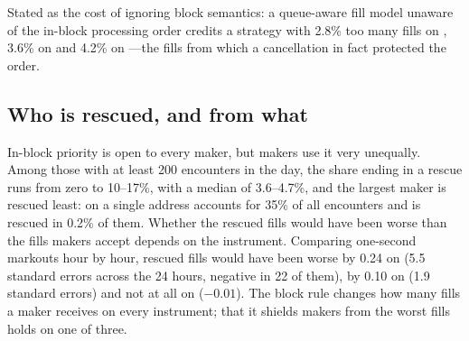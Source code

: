 Stated as the cost of ignoring block semantics: a queue-aware fill model unaware
of the in-block processing order credits a strategy with 2.8\% too many fills on
\BTC, 3.6\% on \ETH{} and 4.2\% on \SOL---the fills from which a cancellation in
fact protected the order.

\subsection{Who is rescued, and from what}
In-block priority is open to every maker, but makers use it very unequally. Among
those with at least 200 encounters in the day, the share ending in a rescue runs
from zero to 10--17\%, with a median of 3.6--4.7\%, and the largest maker is
rescued least: on \BTC{} a single address accounts for 35\% of all encounters and
is rescued in 0.2\% of them. Whether the rescued fills would have been worse than
the fills makers accept depends on the instrument. Comparing one-second markouts
hour by hour, rescued fills would have been worse by 0.24\bps{} on \SOL{} (5.5
standard errors across the 24 hours, negative in 22 of them), by 0.10\bps{} on
\ETH{} (1.9 standard errors) and not at all on \BTC{} ($-0.01$\bps). The block rule
changes how many fills a maker receives on every instrument; that it shields
makers from the worst fills holds on one of three.
